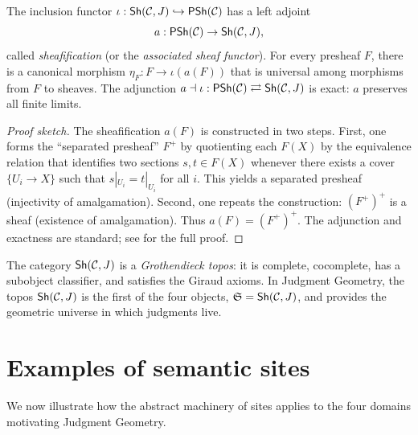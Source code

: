 \begin{proposition}[Sheafification]
\label{prop:sheafification}
The inclusion functor $\iota : \mathsf{Sh}(\mathcal{C}, J) \hookrightarrow
\mathsf{PSh}(\mathcal{C})$ has a left adjoint
\[
  a : \mathsf{PSh}(\mathcal{C}) \to \mathsf{Sh}(\mathcal{C}, J),
\]
called \emph{sheafification} (or the \emph{associated sheaf functor}).
For every presheaf $F$, there is a canonical morphism
$\eta_F : F \to \iota(a(F))$ that is universal among morphisms from
$F$ to sheaves.  The adjunction
$a \dashv \iota : \mathsf{PSh}(\mathcal{C}) \rightleftarrows \mathsf{Sh}(\mathcal{C}, J)$
is exact: $a$ preserves all finite limits.
\end{proposition}

\begin{proof}[Proof sketch]
The sheafification $a(F)$ is constructed in two steps.  First, one
forms the ``separated presheaf'' $F^+$ by quotienting each $F(X)$ by
the equivalence relation that identifies two sections $s, t \in F(X)$
whenever there exists a cover $\{U_i \to X\}$ such that $s|_{U_i} = t|_{U_i}$
for all $i$.  This yields a separated presheaf (injectivity of
amalgamation).  Second, one repeats the construction: $(F^+)^+$ is a
sheaf (existence of amalgamation).  Thus $a(F) = (F^+)^+$.  The
adjunction and exactness are standard; see \cite{johnstone2002} for
the full proof.
\end{proof}

\begin{remark}
\label{rem:topos}
The category $\mathsf{Sh}(\mathcal{C}, J)$ is a \emph{Grothendieck topos}: it
is complete, cocomplete, has a subobject classifier, and satisfies
the Giraud axioms.  In Judgment Geometry, the topos $\mathsf{Sh}(\mathcal{C}, J)$
is the first of the four objects, $\mathfrak{S} = \mathsf{Sh}(\mathcal{C}, J)$, and
provides the geometric universe in which judgments live.
\end{remark}



\section{Examples of semantic sites}
\label{sec:sites:examples}

We now illustrate how the abstract machinery of sites applies to the
four domains motivating Judgment Geometry.

